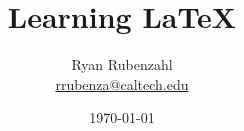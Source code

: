 \documentclass[10pt]{beamer}
\begin{document}
\author[Ryan Rubenzahl]{\begin{tabular}{c} 
	Ryan Rubenzahl \\
    \href{mailto:rrubenza@caltech.edu}{rrubenza@caltech.edu} \\ 
\end{tabular}}

\date[\today]{\today}
\title[Learning \LaTeX \hspace{.81\textwidth} \insertframenumber/\inserttotalframenumber]{{\Large Learning \LaTeX}}

\beamertemplatenavigationsymbolsempty

\def \bi {\begin{itemize}\item}
\def \ei {\end{itemize}}

\frame{\titlepage}



\end{document}
